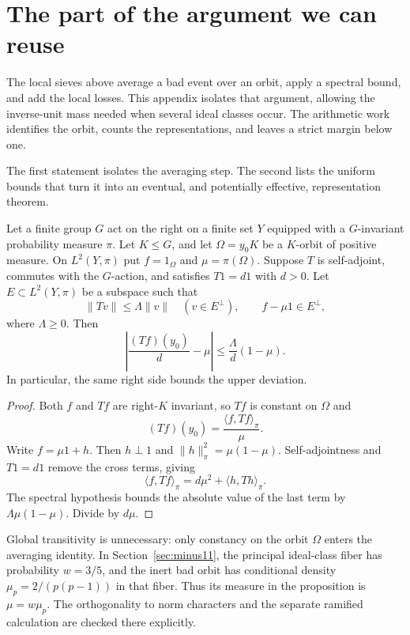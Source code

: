 \section{The part of the argument we can reuse}\label{sec:orbit-criterion}
The local sieves above average a bad event over an orbit, apply a spectral
bound, and add the local losses. This appendix isolates that argument,
allowing the inverse-unit mass needed when several ideal classes occur.
The arithmetic work identifies the orbit, counts the representations,
and leaves a strict margin below one.

The first statement isolates the averaging step. The second lists the
uniform bounds that turn it into an eventual, and potentially effective,
representation theorem.

\begin{proposition}\label{prop:orbit-averaging}
Let a finite group $G$ act on the right on a finite set $Y$ equipped
with a $G$-invariant probability measure $\pi$. Let $K\le G$, and let
$\Omega=y_0K$ be a $K$-orbit of positive measure. On $L^2(Y,\pi)$ put
$f=1_\Omega$ and $\mu=\pi(\Omega)$. Suppose $T$ is self-adjoint,
commutes with the $G$-action, and satisfies $T1=d1$ with $d>0$.
Let $E\subset L^2(Y,\pi)$ be a subspace such that
\[
\|Tv\|\le\Lambda\|v\|\quad(v\in E^\perp),\qquad
f-\mu1\in E^\perp,
\]
where $\Lambda\ge0$. Then
\[
\left|\frac{(Tf)(y_0)}d-\mu\right|
\le\frac\Lambda d(1-\mu).
\]
In particular, the same right side bounds the upper deviation.
\end{proposition}
\begin{proof}
Both $f$ and $Tf$ are right-$K$ invariant, so $Tf$ is constant on
$\Omega$ and
\[
(Tf)(y_0)=\frac{\langle f,Tf\rangle_\pi}{\mu}.
\]
Write $f=\mu1+h$. Then $h\perp1$ and
$\|h\|_\pi^2=\mu(1-\mu)$. Self-adjointness and $T1=d1$ remove the
cross terms, giving
\[
\langle f,Tf\rangle_\pi=d\mu^2+\langle h,Th\rangle_\pi.
\]
The spectral hypothesis bounds the absolute value of the last term by
$\Lambda\mu(1-\mu)$. Divide by $d\mu$.
\end{proof}

Global transitivity is unnecessary: only constancy on the orbit
$\Omega$ enters the averaging identity. In Section~\ref{sec:minus11},
the principal ideal-class fiber has probability $w=3/5$, and the inert
bad orbit has conditional density $\mu_p=2/(p(p-1))$ in that fiber.
Thus its measure in the proposition is $\mu=w\mu_p$.
The orthogonality to norm characters and the separate ramified
calculation are checked there explicitly.

